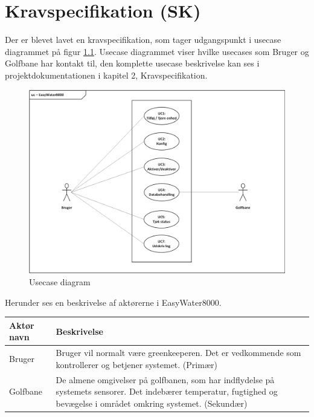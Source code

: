\chapter{Kravspecifikation (SK)}

Der er blevet lavet en kravspecifikation, som tager udgangspunkt i usecase diagrammet på figur \ref{lab:usecasediagram}. Usecase diagrammet viser hvilke usecases som Bruger og Golfbane har kontakt til, den komplette usecase beskrivelse kan ses i projektdokumentationen i kapitel 2, Kravspecifikation. 

\begin{figure}[H] \centering
\vspace*{\fill}
\includegraphics[width=\textwidth]{Billeder/Usecase_Diagram}
\caption{Usecase diagram}
\label{lab:usecasediagram}
\vspace*{\fill}
\end{figure}

Herunder ses en beskrivelse af aktørerne i EasyWater8000.

\begin{table}[!htbp] \centering
	\begin{tabular}{|p{2.5cm}|p{11.5cm}|}
	\hline
		\textbf{Aktør navn} & \textbf{Beskrivelse} \\\hline
		Bruger & Bruger vil normalt være greenkeeperen. Det er vedkommende som kontrollerer og betjener systemet. (Primær) \\\hline

		Golfbane & De almene omgivelser på golfbanen, som har indflydelse på systemets sensorer. Det indebærer temperatur, fugtighed og bevægelse i området omkring systemet. (Sekundær) \\\hline
	\end{tabular}
\end{table}

